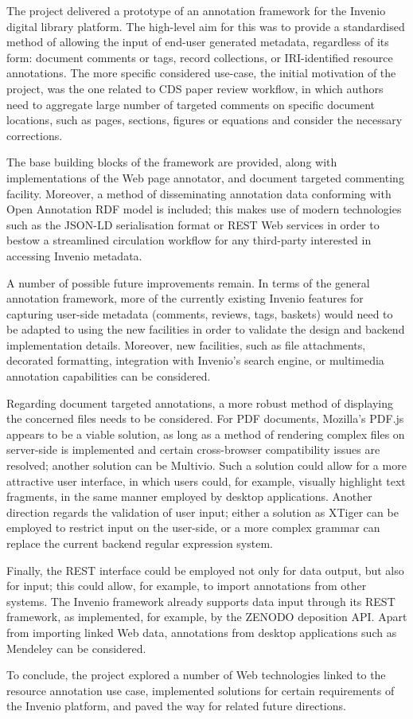 
The project delivered a prototype of an annotation framework for the Invenio
digital library platform. The high-level aim for this was to provide a
standardised method of allowing the input of end-user generated metadata,
regardless of its form: document comments or tags, record collections, or
IRI-identified resource annotations. The more specific considered use-case, the
initial motivation of the project, was the one related to CDS paper review
workflow, in which authors need to aggregate large number of targeted comments
on specific document locations, such as pages, sections, figures or equations and
consider the necessary corrections.

The base building blocks of the framework are provided, along with
implementations of the Web page annotator, and document targeted commenting
facility. Moreover, a method of disseminating annotation data conforming with
Open Annotation RDF model is included; this makes use of modern
technologies such as the JSON-LD serialisation format or REST Web services in
order to bestow a streamlined circulation workflow for any third-party
interested in accessing Invenio metadata.

A number of possible future improvements remain. In terms of the general
annotation framework, more of the currently existing Invenio features for
capturing user-side metadata (comments, reviews, tags, baskets) would need
to be adapted to using the new facilities in order to validate the design and
backend implementation details. Moreover, new facilities, such as file
attachments, decorated formatting, integration with Invenio's search engine, or
multimedia annotation capabilities can be considered.

Regarding document targeted annotations, a more robust method of displaying the
concerned files needs to be considered. For PDF documents, Mozilla's PDF.js
appears to be a viable solution, as long as a method of rendering complex files
on server-side is implemented and certain cross-browser compatibility issues
are resolved; another solution can be Multivio. Such a solution could allow for
a more attractive user interface, in which users could, for example, visually
highlight text fragments, in the same manner employed by desktop applications.
Another direction regards the validation of user input; either a solution as
XTiger can be employed to restrict input on the user-side, or a more complex
grammar can replace the current backend regular expression system.

Finally, the REST  interface could be employed not only for data output, but
also for input; this could allow, for example, to import annotations from other
systems. The Invenio framework already supports data input through its REST
framework, as implemented, for example, by the ZENODO deposition API. Apart
from importing linked Web  data, annotations from desktop applications such as
Mendeley can be considered.

To conclude, the project explored a number of Web technologies linked to the
resource annotation use case, implemented solutions for certain requirements of
the Invenio platform, and paved the way for related future directions.
